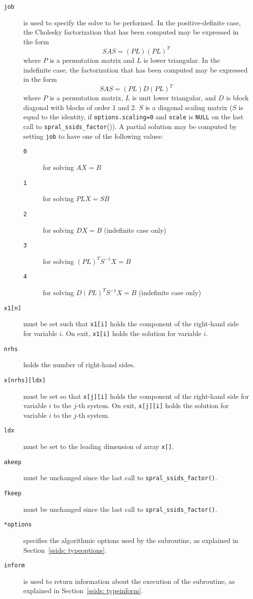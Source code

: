 \begin{description}
\item[\texttt{job}] is used to specify the solve to be performed.
   In the positive-definite case, the Cholesky factorization that has been
   computed may be expressed in the form
   \[ {SAS} = ({PL})({PL})^T \]
   where $P$ is a permutation matrix and $L$ is lower triangular.
   In the indefinite case, the factorization that has been computed may be
   expressed in the form
   \[ {S AS} = ({PL}){D}({PL})^T \]
   where $P$ is a permutation matrix, $L$ is unit lower triangular, and $D$ is
   block diagonal with blocks of order 1 and 2. $S$ is a diagonal scaling
   matrix ($S$ is equal to the identity, if \texttt{options.scaling=0} and
   {\tt scale} is \texttt{NULL} on the last call to {\tt spral\_ssids\_factor}()).
   A partial solution may be computed by setting {\tt job} to have one of the
   following values:
   \begin{description}
   \item[\texttt{0}] for solving $AX = B$
   \item[\texttt{1}] for solving ${PLX} = {SB}$
   \item[\texttt{2}] for solving ${DX} = {B}$ (indefinite case only)
   \item[\texttt{3}] for solving $({PL})^T{S^{-1}X} = {B}$
   \item[\texttt{4}] for solving $D({PL})^T{S^{-1}X} = {B}$ (indefinite case only)
   \end{description}

\item[\texttt{x1[n]}] must be set
   such that \texttt{x1[i]} holds the component of the right-hand side for
   variable $i$. On exit, \texttt{x1[i]} holds the solution for variable
   $i$.

\item[\texttt{nrhs}] holds the number of right-hand sides.

\item[\texttt{x[nrhs][ldx]}] must be set so that \texttt{x[j][i]} holds the
   component of the right-hand side for variable $i$ to the $j$-th
   system. On exit, \texttt{x[j][i]} holds the solution for variable $i$ to
   the $j$-th system.

\item[\texttt{ldx}] must be set to the leading dimension of array \texttt{x[]}.

\item[\texttt{akeep}] must be unchanged since the last call to
   {\tt spral\_ssids\_factor()}.

\item[\texttt{fkeep}] must be unchanged since the last call to
   {\tt spral\_ssids\_factor()}.

\item[\texttt{*options}] specifies the algorithmic options used by the
   subroutine, as explained in Section~\ref{ssids: typeoptions}.

\item[\texttt{inform}] is used to return information about the execution
   of the subroutine, as explained in Section~\ref{ssids: typeinform}.

\end{description}

